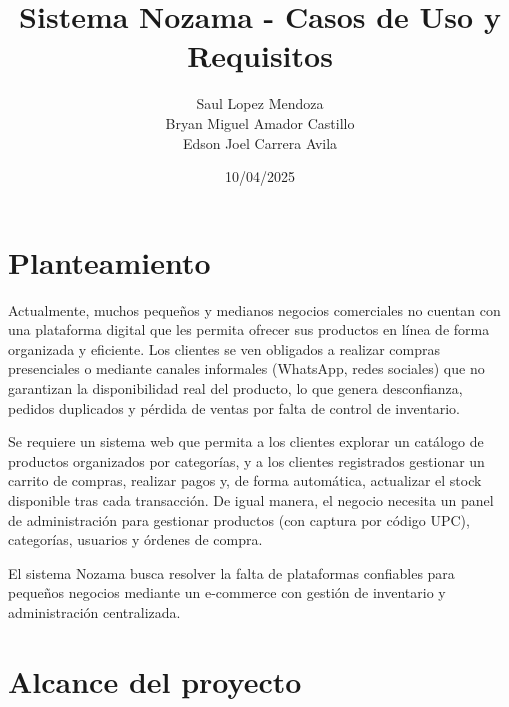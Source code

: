 \documentclass[12pt,a4paper]{article}
\title{Sistema Nozama - Casos de Uso y Requisitos}
\author{Saul Lopez Mendoza \\ Bryan Miguel Amador Castillo \\ Edson Joel Carrera Avila}
\date{10/04/2025}
\begin{document}
\maketitle
\tableofcontents
\newpage


\section{Planteamiento}
Actualmente, muchos pequeños y medianos negocios comerciales no cuentan con
una plataforma digital que les permita ofrecer sus productos en línea de forma
organizada y eficiente. Los clientes se ven obligados a realizar compras
presenciales o mediante canales informales (WhatsApp, redes sociales) que no
garantizan la disponibilidad real del producto, lo que genera desconfianza, pedidos
duplicados y pérdida de ventas por falta de control de inventario.

Se requiere un sistema web que permita a los clientes explorar un catálogo de
productos organizados por categorías, y a los clientes registrados gestionar un
carrito de compras, realizar pagos y, de forma automática, actualizar el stock
disponible tras cada transacción. De igual manera, el negocio necesita un panel de
administración para gestionar productos (con captura por código UPC), categorías,
usuarios y órdenes de compra.

El sistema Nozama busca resolver la falta de plataformas confiables para pequeños
negocios mediante un e-commerce con gestión de inventario y administración centralizada.


\section{Alcance del proyecto}
\end{document}

